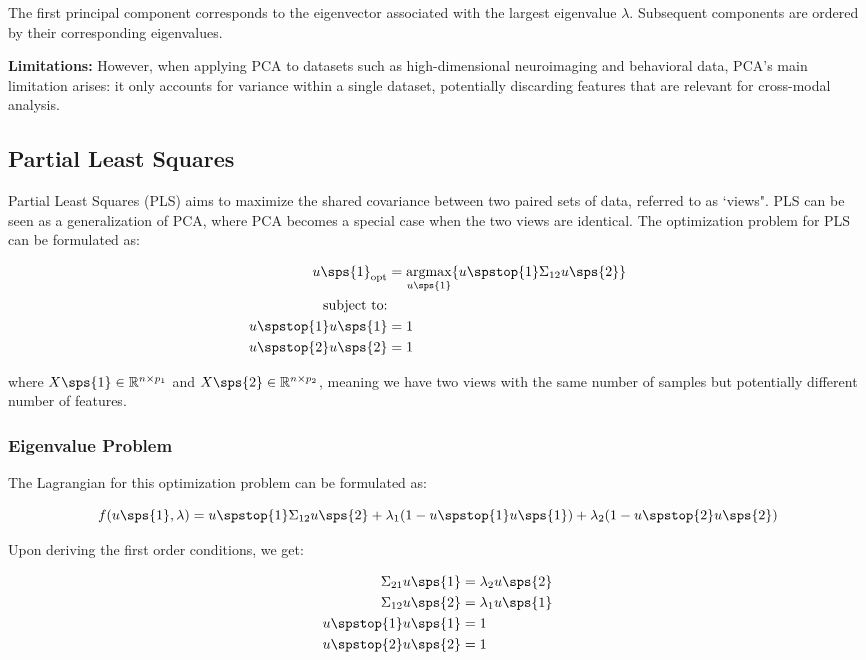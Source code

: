 The first principal component corresponds to the eigenvector associated with the largest eigenvalue \(\lambda\). Subsequent components are ordered by their corresponding eigenvalues.

\textbf{Limitations: }However, when applying PCA to datasets such as high-dimensional neuroimaging and behavioral
data, PCA's main limitation arises: it only accounts for variance within a single dataset, potentially discarding features that are relevant for cross-modal analysis.

\subsection{Partial Least Squares}

Partial Least Squares (PLS)\cite{wold1975path} aims to maximize the shared covariance between two paired sets of data, referred to as `views". PLS can be seen as a generalization of PCA, where PCA becomes a special case when the two views are identical. The optimization problem for PLS can be formulated as:

\begin{align}
     u\sps{1}_{\text{opt}} &= \underset{u\sps{1}}{\mathrm{argmax}} \{ u\spstop{1} \Sigma_{12} u\sps{2} \} \\
     \text{subject to:} \notag \\
     u\spstop{1}u\sps{1} &= 1 \notag \\
     u\spstop{2}u\sps{2} &= 1 \notag
\end{align}

where \( X\sps{1} \in \mathbb{R}^{n \times p_1} \) and \( X\sps{2} \in \mathbb{R}^{n \times p_2} \), meaning we have two views with the same number of samples but potentially different number of features.

\subsubsection{Eigenvalue Problem}

The Lagrangian for this optimization problem can be formulated as:

\begin{equation}
f(u\sps{1}, \lambda) = u\spstop{1} \Sigma_{12} u\sps{2} + \lambda_1 (1 - u\spstop{1}u\sps{1}) + \lambda_2 (1 - u\spstop{2}u\sps{2})
\end{equation}

Upon deriving the first order conditions, we get:

\begin{align}
    \Sigma_{21} u\sps{1} &= \lambda_2 u\sps{2} \\
    \Sigma_{12} u\sps{2} &= \lambda_1 u\sps{1} \\
    u\spstop{1}u\sps{1} &= 1 \\
    u\spstop{2}u\sps{2} &= 1
\end{align}

